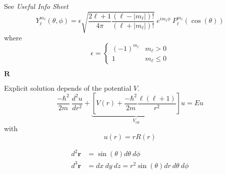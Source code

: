 
See \textit{Useful Info Sheet}
\begin{equation*}
    Y_{\ell}^{m_\ell}(\theta, \phi) = \epsilon\sqrt{\frac{2\ell+1}{4\pi}\frac{(\ell-|m_\ell|)!}{(\ell+|m_\ell|)!}}\:e^{im_\ell\phi}\:P_{\ell}^{m_\ell}(\cos(\theta))
\end{equation*}
where
\begin{equation*}
    \epsilon = \begin{cases}
        {(-1)}^{m_\ell} & m_\ell > 0    \\
        1               & m_\ell \leq 0
    \end{cases}
\end{equation*}

\newpar{}
 $\mathbf{R}$

Explicit solution depends of the potential $V$.
\begin{equation*}
    \frac{-\hbar^2}{2m}\:\frac{d^2u}{dr^2}+\underbrace{\left[V(r)+\frac{-\hbar^2}{2m}\frac{\ell(\ell+1)}{r^2}\right]}_{V_{\text{eff}}}u = Eu
\end{equation*}
with
\begin{equation*}
    u(r) = rR(r)
\end{equation*}

\begin{align*}
    d^2\mathbf{r} & = \sin(\theta)d\theta\:d\phi                     \\
    d^3\mathbf{r} & = dx\:dy\:dz = r^2\sin(\theta)dr\:d\theta\:d\phi
\end{align*}

